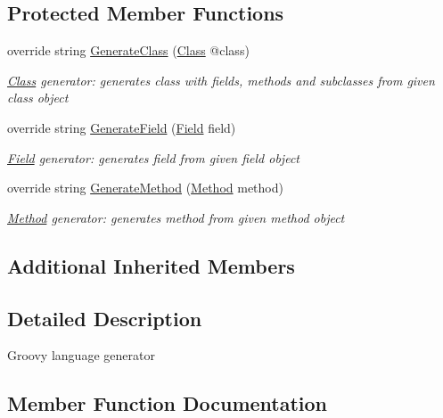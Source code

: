 \subsection*{Protected Member Functions}
\begin{DoxyCompactItemize}
\item 
override string \mbox{\hyperlink{classCodeGen_1_1generators_1_1GroovyGenerator_af13381a7be697b1f22cbf39bc0ab0e8d}{Generate\+Class}} (\mbox{\hyperlink{classCodeGen_1_1generators_1_1Class}{Class}} @class)
\begin{DoxyCompactList}\small\item\em \mbox{\hyperlink{classCodeGen_1_1generators_1_1Class}{Class}} generator\+: generates class with fields, methods and subclasses from given class object  \end{DoxyCompactList}\item 
override string \mbox{\hyperlink{classCodeGen_1_1generators_1_1GroovyGenerator_a8ccffd1ee31dfad7f7599ab0bca0dc6b}{Generate\+Field}} (\mbox{\hyperlink{classCodeGen_1_1generators_1_1Field}{Field}} field)
\begin{DoxyCompactList}\small\item\em \mbox{\hyperlink{classCodeGen_1_1generators_1_1Field}{Field}} generator\+: generates field from given field object  \end{DoxyCompactList}\item 
override string \mbox{\hyperlink{classCodeGen_1_1generators_1_1GroovyGenerator_a7c8d2446310971e10a24b802bd9c62a0}{Generate\+Method}} (\mbox{\hyperlink{classCodeGen_1_1generators_1_1Method}{Method}} method)
\begin{DoxyCompactList}\small\item\em \mbox{\hyperlink{classCodeGen_1_1generators_1_1Method}{Method}} generator\+: generates method from given method object  \end{DoxyCompactList}\end{DoxyCompactItemize}
\subsection*{Additional Inherited Members}


\subsection{Detailed Description}
Groovy language generator 



\subsection{Member Function Documentation}
\mbox{\label{classCodeGen_1_1generators_1_1GroovyGenerator_af13381a7be697b1f22cbf39bc0ab0e8d}} 
